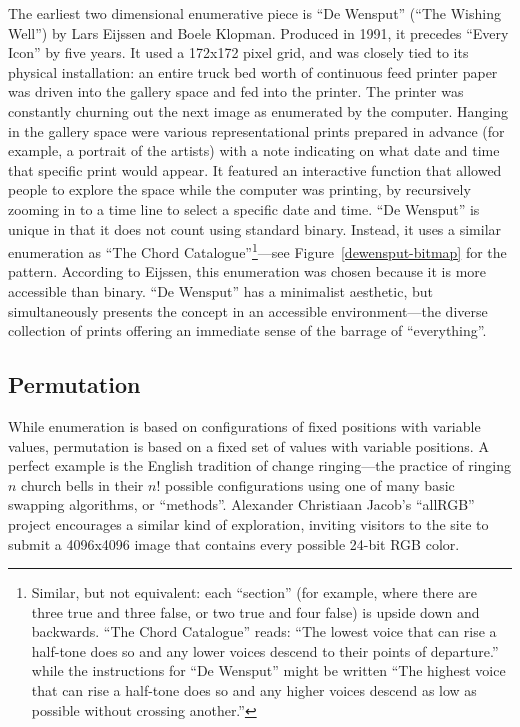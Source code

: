 \documentclass{thesis}
\begin{document}
The earliest two dimensional enumerative piece is ``De Wensput'' (``The Wishing Well'') by Lars Eijssen and Boele Klopman.\cite{remko_scha_every_2001} Produced in 1991, it precedes ``Every Icon'' by five years. It used a 172x172 pixel grid, and was closely tied to its physical installation: an entire truck bed worth of continuous feed printer paper was driven into the gallery space and fed into the printer. The printer was constantly churning out the next image as enumerated by the computer. Hanging in the gallery space were various representational prints prepared in advance (for example, a portrait of the artists) with a note indicating on what date and time that specific print would appear. It featured an interactive function that allowed people to explore the space while the computer was printing, by recursively zooming in to a time line to select a specific date and time. ``De Wensput'' is unique in that it does not count using standard binary. Instead, it uses a similar enumeration as ``The Chord Catalogue''\footnote{Similar, but not equivalent: each ``section'' (for example, where there are three true and three false, or two true and four false) is upside down and backwards. ``The Chord Catalogue'' reads: ``The lowest voice that can rise a half-tone does so and any lower voices descend to their points of departure.'' while the instructions for ``De Wensput'' might be written ``The highest voice that can rise a half-tone does so and any higher voices descend as low as possible without crossing another.''}---see Figure~\ref{dewensput-bitmap} for the pattern. According to Eijssen, this enumeration was chosen because it is more accessible than binary.\cite{eijssen_im} ``De Wensput'' has a minimalist aesthetic, but simultaneously presents the concept in an accessible environment---the diverse collection of prints offering an immediate sense of the barrage of ``everything''.

\subsection{Permutation}

While enumeration is based on configurations of fixed positions with variable values, permutation is based on a fixed set of values with variable positions. A perfect example is the English tradition of change ringing---the practice of ringing $n$ church bells in their $n!$ possible configurations using one of many basic swapping algorithms, or ``methods''. Alexander Christiaan Jacob's ``allRGB''\cite{alexander_christiaan_jacob_allrgb_2008} project encourages a similar kind of exploration, inviting visitors to the site to submit a 4096x4096 image that contains every possible 24-bit RGB color.
\end{document}
